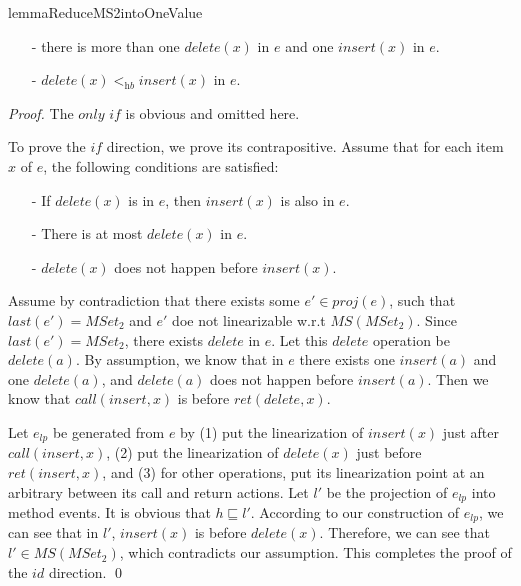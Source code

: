 {\begin{restatable}{lemma}{ReduceMS2intoOneValue}
\begin{itemize}
\item[-] there is more than one $\textit{delete}(x)$ in $e$ and one $\textit{insert}(x)$ in $e$.

\item[-] $\textit{delete}(x) <_{\textit{hb}} \textit{insert}(x)$ in $e$.
\end{itemize}
\end{restatable}

\begin {proof}

The $\textit{only if}$ is obvious and omitted here.

To prove the $\textit{if}$ direction, we prove its contrapositive. Assume that for each item $x$ of $e$, the following conditions are satisfied:

\begin{itemize}
\setlength{\itemsep}{0.5pt}
\item[-] If $\textit{delete}(x)$ is in $e$, then $\textit{insert}(x)$ is also in $e$.

\item[-] There is at most $\textit{delete}(x)$ in $e$.

\item[-] $\textit{delete}(x)$ does not happen before $\textit{insert}(x)$.
\end{itemize}

Assume by contradiction that there exists some $e' \in \textit{proj}(e)$, such that $\textit{last}(e') = \textit{MSet}_2$ and $e'$ doe not linearizable w.r.t $\textit{MS}(\textit{MSet}_2)$. Since $\textit{last}(e') = \textit{MSet}_2$, there exists $\textit{delete}$ in $e$. Let this $\textit{delete}$ operation be $\textit{delete}(a)$. By assumption, we know that in $e$ there exists one $\textit{insert}(a)$ and one $\textit{delete}(a)$, and $\textit{delete}(a)$ does not happen before $\textit{insert}(a)$. Then we know that $\textit{call}(\textit{insert},x)$ is before $\textit{ret}(\textit{delete},x)$.

Let $e_{\textit{lp}}$ be generated from $e$ by (1) put the linearization of $\textit{insert}(x)$ just after $\textit{call}(\textit{insert},x)$, (2) put the linearization of $\textit{delete}(x)$ just before $\textit{ret}(\textit{insert},x)$, and (3) for other operations, put its linearization point at an arbitrary between its call and return actions. Let $l'$ be the projection of $e_{\textit{lp}}$ into method events. It is obvious that $h \sqsubseteq l'$. According to our construction of $e_{\textit{lp}}$, we can see that in $l'$, $\textit{insert}(x)$ is before $\textit{delete}(x)$. Therefore, we can see that $l' \in \textit{MS}(\textit{MSet}_2)$, which contradicts our assumption. This completes the proof of the $\textit{id}$ direction. \qed
\end {proof}

}
